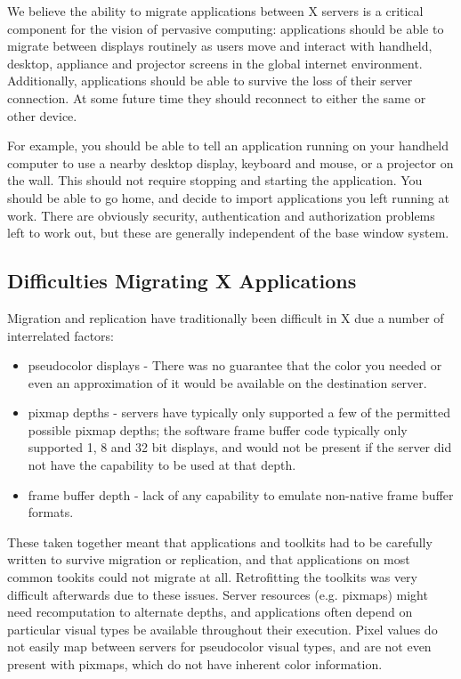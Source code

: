 \documentclass[twocolumn]{article}
\begin{document}
We believe the ability to migrate applications between X servers is a
critical component for the vision of pervasive computing: applications
should be able to migrate between displays routinely as users move and
interact with handheld, desktop, appliance and projector screens in the
global internet environment.  Additionally, applications should be able to
survive the loss of their server connection.  At some future time they
should reconnect to either the same or other device.

For example, you should be able to tell an application running on your
handheld computer to use a nearby desktop display, keyboard and mouse,
or a projector on the wall.  This should not require stopping and
starting the application.  You should be able to go home, and decide
to import applications you left running at work. There are obviously
security, authentication and authorization problems left to work out,
but these are generally independent of the base window system.

\subsection{Difficulties Migrating X Applications}

Migration and replication have traditionally been difficult in X due a
number of interrelated factors:

\begin{itemize}
\item pseudocolor displays - There was no guarantee that the color you needed or 
even an approximation of it would be available on the destination server.
\item pixmap depths - servers have typically only supported a few
of the permitted possible pixmap depths;
the software frame buffer code typically only supported 1, 8 and
32 bit displays, and would not be present if the server did not
have the capability to be used at that depth.
\item frame buffer depth - lack of any capability to emulate non-native
frame buffer formats.
\end{itemize}

These taken together meant that applications and toolkits had to be
carefully written to survive migration or replication, and that
applications on most common tookits could not migrate at all.
Retrofitting the toolkits was very difficult afterwards due to these
issues.  Server resources (e.g. pixmaps) might need recomputation to
alternate depths, and applications often depend on particular visual types
be available throughout their execution.  Pixel values do not easily
map between servers for pseudocolor visual types, and are not even
present with pixmaps, which do not have inherent color information.
\end{document}
